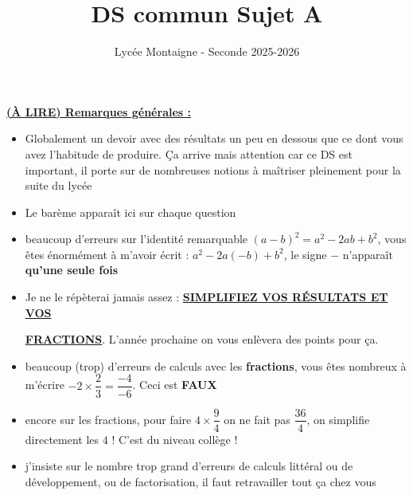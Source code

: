 \documentclass[12pt]{article}
\title{DS commun Sujet A}
\author{Lycée Montaigne - Seconde 2025-2026}
\date{}
\begin{document}
\maketitle

{\color{red}
\underline{\textbf{(À LIRE) Remarques générales :}}

\vspace{5pt}
\begin{itemize}
    \item Globalement un devoir avec des résultats un peu en dessous que ce dont vous avez l'habitude
    de produire. Ça arrive mais attention car ce DS est important, il porte sur de nombreuses 
    notions à maîtriser pleinement pour la suite du lycée

    \vspace{5pt}
    \item Le barème apparaît ici sur chaque question 
    
    \vspace{5pt}
    \item beaucoup d'erreurs sur l'identité remarquable $(a-b)^2 = a^2 - 2ab + b^2$, vous êtes énormément
    à m'avoir écrit : $a^2 -2a(-b) + b^2$, le signe $-$ n'apparaît \textbf{qu'une seule fois}

    \vspace{5pt}
    \item Je ne le répèterai jamais assez : \textbf{\underline{SIMPLIFIEZ VOS RÉSULTATS ET VOS}}

    \noindent\textbf{\underline{FRACTIONS}}. L'année prochaine on vous enlèvera des points pour ça.
    
    \vspace{5pt}
    \item beaucoup (trop) d'erreurs de calculs avec les \textbf{fractions}, vous êtes nombreux à 
    m'écrire $-2 \times \dfrac{2}{3} = \dfrac{-4}{-6}$. Ceci est \textbf{FAUX}

    \vspace{5pt}
    \item encore sur les fractions, pour faire $4 \times \dfrac{9}{4}$ on ne fait pas $\dfrac{36}{4}$,
    on simplifie directement les $4$ ! C'est du niveau collège !

    \vspace{5pt}
    \item j'insiste sur le nombre trop grand d'erreurs de calculs littéral ou de développement, ou 
    de factorisation, il faut retravailler tout ça chez vous
\end{itemize}
}
\end{document}
